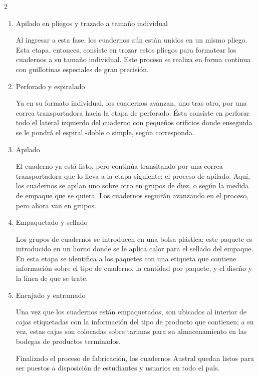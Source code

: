 \begin{multicols}{2}
\begin{enumerate}
\item Apilado en pliegos y trazado a tamaño individual

Al ingresar a esta fase, los cuadernos aún están unidos en un mismo pliego. Esta etapa, entonces, consiste en trozar estos pliegos para formatear los cuadernos a su tamaño individual. Este proceso se realiza en forma continua con guillotinas especiales de gran precisión.

\item Perforado y espiralado

Ya en su formato individual, los cuadernos avanzan, uno tras otro, por una correa transportadora hacia la etapa de perforado. Ésta consiste en perforar todo el lateral izquierdo del cuaderno con pequeños orificios donde enseguida se le pondrá el espiral -doble o simple, según corresponda.

\item Apilado

El cuaderno ya está listo, pero continúa transitando por una correa transportadora que lo lleva a la etapa siguiente: el proceso de apilado. Aquí, los cuadernos se apilan uno sobre otro en grupos de diez, o según la medida de empaque que se quiera. Los cuadernos seguirán avanzando en el proceso, pero ahora van en grupos.

\item Empaquetado y sellado

Los grupos de cuadernos se introducen en una bolsa plástica; este paquete es introducido en un horno donde se le aplica calor para el sellado del empaque. En esta etapa se identifica a los paquetes con una etiqueta que contiene información sobre el tipo de cuaderno, la cantidad por paquete, y el diseño y la línea de que se trate.

\item Encajado y entramado

Una vez que los cuadernos están empaquetados, son ubicados al interior de cajas etiquetadas con la información del tipo de producto que contienen; a su vez, estas cajas son colocadas sobre tarimas para su almacenamiento en las bodegas de productos terminados.

Finalizado el proceso de fabricación, los cuadernos Austral quedan listos para ser puestos a disposición de estudiantes y usuarios en todo el país.

\end{enumerate}
\end{multicols}
\newpage
{}

